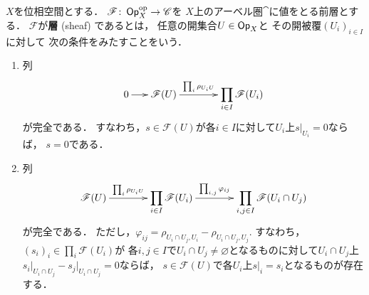 \begin{leftbar}
\begin{DFN}[層]\label{def:sheaf}
    \(X\)を位相空間とする．
    \(\mathscr{F}\colon\mathop{\textsf{Op}}\nolimits_{X}^{{\rm op}}\to\mathscr{C}\)を
    \(X\)上のアーベル圏\(\cat\)に値をとる前層とする．
    \(\mathscr{F}\)が\textbf{層} (sheaf) であるとは，
    任意の開集合\(U\in\mathop{\textsf{Op}}\nolimits_{X}\)と
    その開被覆\(\left(U_i\right)_{i\in I}\)に対して
    次の条件をみたすことをいう．
    \begin{enumerate}[(S1)]
        \item 列
        \[\vcenter{\xymatrix
            @C=16pt@R=28pt{
            0\ar[r]
            &
            \mathscr{F}(U)
            \ar[rr]^-{\prod_i\rho_{U_iU}}
            &&
            \dip \prod_{i\in I}\mathscr{F}(U_i)
        }}\]が完全である．
        すなわち，\(s\in\mathscr{F}(U)\)が各\(i\in I\)に対して\(U_i\)上\(s\rvert_{U_{i}}=0\)ならば，
        \(s=0\)である．\label{sheaf-cond1}
        \item 列
        \[\vcenter{\xymatrix
            @C=16pt@R=28pt{
            \mathscr{F}(U)
            \ar[rr]^-{\prod_i\rho_{U_iU}}
            &&
            \dip \prod_{i\in I}\mathscr{F}(U_i)
            \ar[rr]^-{\prod_{i,j}\varphi_{ij}}
            &&
            \dip \prod_{i,j\in I}\mathscr{F}(U_i\cap U_j)
        }}\]が完全である．
        ただし，\(\varphi_{ij}=\rho_{U_{i}\cap U_{j},U_i}-\rho_{U_{i}\cap U_{j},U_j}\). 
        すなわち，\(\left(s_i\right)_i\in\prod_{i}\mathscr{F}(U_i)\)が
        各\(i,j\in I\)で\(U_i\cap U_j\ne\varnothing\)となるものに対して\(U_i\cap U_j\)上\(s_i\rvert_{U_i\cap U_j}-s_j\rvert_{U_i\cap U_j}=0\)ならば，
        \(s\in\mathscr{F}(U)\)で各\(U_i\)上\(s\rvert_i=s_i\)となるものが存在する．\label{sheaf-cond2}
    \end{enumerate}
\end{DFN}
\end{leftbar}

